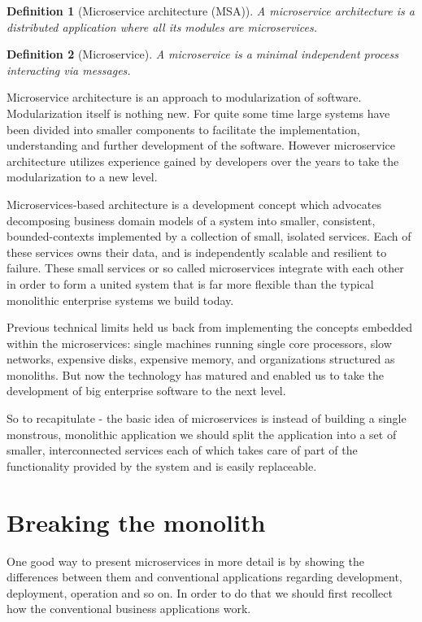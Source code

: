 \documentclass[12pt,oneside]{fithesis2}
\newtheorem{definition}{Definition}
\begin{document}
\begin{definition}[Microservice architecture (MSA)]
A microservice architecture is a distributed application where all its modules are microservices. \cite{mytat}
\end{definition}

\begin{definition}[Microservice]
A microservice  is  a  minimal  independent  process  interacting via messages. \cite{mytat}
\end{definition}

Microservice architecture is an approach to modularization of software. Modularization itself is nothing new. For quite some time large systems have been divided into smaller components to facilitate the implementation, understanding and further development of the software. However microservice architecture utilizes experience gained by developers over the years to take the modularization to a new level.

Microservices-based architecture is a development concept which advocates decomposing business domain models of a system into smaller, consistent, bounded-contexts implemented by a collection of small, isolated services. Each of these services owns their data, and is independently scalable and resilient to failure. These small services or so called microservices integrate with each other in order to form a united system that is far more flexible than the typical monolithic enterprise systems we build today. \cite{rma}

Previous technical limits held us back from implementing the concepts embedded within the microservices: single machines running single core processors, slow networks, expensive disks, expensive memory, and organizations structured as monoliths. But now the technology has matured and enabled us to take the development of big enterprise software to the next level.

So to recapitulate - the basic idea of microservices is instead of building a single monstrous, monolithic application we should split the application into a set of smaller, interconnected services each of which takes care of part of the functionality provided by the system and is easily replaceable.

\section{Breaking the monolith}

One good way to present microservices in more detail is by showing the differences between them and conventional applications regarding development, deployment, operation and so on. In order to do that we should first recollect how the conventional business applications work.
\end{document}
